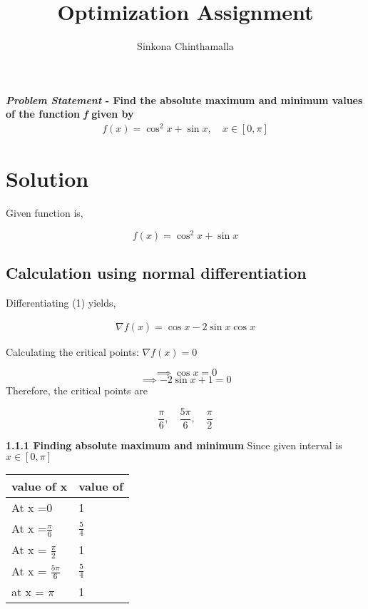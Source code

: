 \documentclass[10pt,twocolumn]{article}
\title{\textbf{Optimization Assignment}}
\author{Sinkona Chinthamalla}
\begin{document}
\maketitle
\paragraph{\textit{Problem Statement} - Find the absolute maximum and minimum values of the function \emph{f} given by 
\begin{align*}
f(x) = \cos^2x + \sin x,\quad x \in [0,\pi] 
\end{align*}} 

\section{Solution}
\begin{flushleft}
Given function is,\\
\end{flushleft}
\begin{equation}
    f(x)=\cos^2x + \sin x
\end{equation}
\subsection{Calculation using normal differentiation}
\begin{flushleft}
Differentiating (1) yields,
\end{flushleft}
\begin{align}
\nabla f(x) = \cos x-2\sin x \cos x 
\end{align}

\noindent Calculating the critical points:
$ \nabla f(x) = 0 $

\begin{equation}
\implies \cos{x} = 0 
\end{equation}
\begin{equation}
\implies -2\sin{x} + 1 = 0
\end{equation}
Therefore, the critical points are 

\begin{equation}
\frac{\pi}{6},\quad\frac{5\pi}{6},\quad\frac{\pi}{2}
\end{equation}

\textbf{1.1.1 Finding absolute maximum and minimum} 
Since given interval is $x \in [0,\pi]$ 

\begin{table}[h]
\centering
\large
\begin{tabular}{|l|l|}
\hline
\textbf{value of x} & \textbf{value of} \\ \hline
At x =0             & 1                 \\ \hline
At x =$ \frac{\pi}{6}$            & $\frac{5}{4}$            \\ \hline
At x =  $ \frac{\pi}{2}$            & 1                 \\ \hline
At x =  $ \frac{5\pi}{6}$            & $\frac{5}{4}$             \\ \hline
at x =       $\pi$       & 1                 \\ \hline
\end{tabular}
\end{table}
\end{document}
